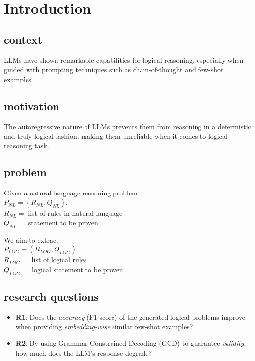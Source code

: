\documentclass[conference]{IEEEtran}
\begin{document}
\begin{IEEEkeywords}
\end{IEEEkeywords}

\section{Introduction}

\subsection*{context}
LLMs have shown remarkable capabilities for logical reasoning, especially when 
guided with prompting techniques such as chain-of-thought and few-shot examples

\subsection*{motivation}
The autoregressive nature of LLMs prevents them from reasoning in a determistic
and truly logical fashion, making them unreliable when it comes to logical reasoning task.

\subsection*{problem}

Given a natural language reasoning problem \\
$P_{NL} = (R_{NL}, Q_{NL})$.\\
$R_{NL} =$ list of rules in natural language\\
$Q_{NL} =$ statement to be proven

We aim to extract \\
$P_{LOG} = (R_{LOG}, Q_{LOG})$ \\
$R_{LOG} =$ list of logical rules\\
$Q_{LOG} =$ logical statement to be proven


\subsection*{research questions}

\begin{itemize}
    \item \textbf{R1}: Does the \textit{accuracy} (F1 score) of the generated logical problems improve when 
    providing \textit{embedding-wise} similar few-shot examples?
    \item \textbf{R2}: By using Grammar Constrained Decoding (GCD) to guarantee \textit{validity}, how 
    much does the LLM's response degrade?
\end{itemize}
\end{document}
